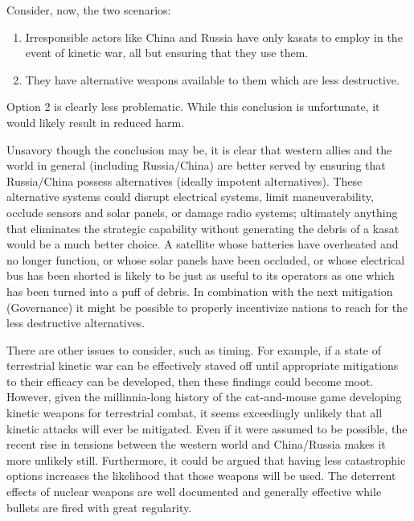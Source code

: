 Consider, now, the two scenarios:

\begin{enumerate}
\item Irresponsible actors like China and Russia have only \acp{kasat}
  to employ in the event of kinetic war, all but ensuring that they
  use them.

\item They have alternative weapons available to them which are less
  destructive.
\end{enumerate}

Option 2 is clearly less problematic.  While this conclusion is
unfortunate, it would likely result in reduced harm.

Unsavory though the conclusion may be, it is clear that western allies
and the world in general (including Russia/China) are better served by
ensuring that Russia/China possess alternatives (ideally impotent
alternatives).  These alternative systems could disrupt electrical
systems, limit maneuverability, occlude sensors and solar panels, or
damage radio systems; ultimately anything that eliminates the
strategic capability without generating the debris of a \ac{kasat}
would be a much better choice.  A satellite whose batteries have
overheated and no longer function, or whose solar panels have been
occluded, or whose electrical bus has been shorted is likely to be
just as useful to its operators as one which has been turned into a
puff of debris.  In combination with the next mitigation (Governance)
it might be possible to properly incentivize nations to reach for the
less destructive alternatives.

There are other issues to consider, such as timing.  For example, if a
state of terrestrial kinetic war can be effectively staved off until
appropriate mitigations to their efficacy can be developed, then these
findings could become moot.  However, given the millinnia-long history
of the cat-and-mouse game developing kinetic weapons for terrestrial
combat, it seems exceedingly unlikely that all kinetic attacks will
ever be mitigated.  Even if it were assumed to be possible, the recent
rise in tensions between the western world and China/Russia makes it
more unlikely still. Furthermore, it could be argued that having less
catastrophic options increases the likelihood that those weapons will
be used.  The deterrent effects of nuclear weapons are well documented
and generally effective\cite[mad]{xxx} while bullets are fired with
great regularity.

